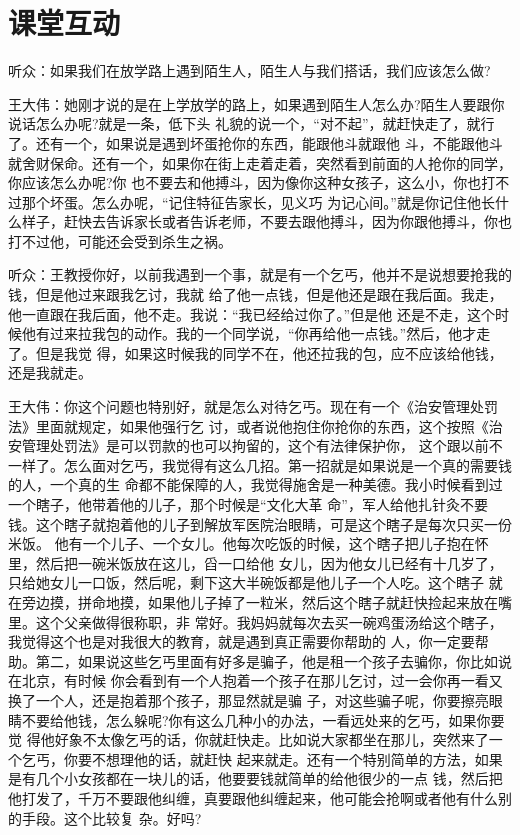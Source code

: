 \documentclass[11pt,a4paper,onecolumn]{article}
\begin{document}
\section{课堂互动}

听众：如果我们在放学路上遇到陌生人，陌生人与我们搭话，我们应该怎么做?

王大伟：她刚才说的是在上学放学的路上，如果遇到陌生人怎么办?陌生人要跟你说话怎么办呢?就是一条，低下头
礼貌的说一个，``对不起''，就赶快走了，就行了。还有一个，如果说是遇到坏蛋抢你的东西，能跟他斗就跟他
斗，不能跟他斗就舍财保命。还有一个，如果你在街上走着走着，突然看到前面的人抢你的同学，你应该怎么办呢?你
也不要去和他搏斗，因为像你这种女孩子，这么小，你也打不过那个坏蛋。怎么办呢，``记住特征告家长，见义巧
为记心间。''就是你记住他长什么样子，赶快去告诉家长或者告诉老师，不要去跟他搏斗，因为你跟他搏斗，你也
打不过他，可能还会受到杀生之祸。

听众：王教授你好，以前我遇到一个事，就是有一个乞丐，他并不是说想要抢我的钱，但是他过来跟我乞讨，我就
给了他一点钱，但是他还是跟在我后面。我走，他一直跟在我后面，他不走。我说：``我已经给过你了。''但是他
还是不走，这个时候他有过来拉我包的动作。我的一个同学说，``你再给他一点钱。''然后，他才走了。但是我觉
得，如果这时候我的同学不在，他还拉我的包，应不应该给他钱，还是我就走。

王大伟：你这个问题也特别好，就是怎么对待乞丐。现在有一个《治安管理处罚法》里面就规定，如果他强行乞
讨，或者说他抱住你抢你的东西，这个按照《治安管理处罚法》是可以罚款的也可以拘留的，这个有法律保护你，
这个跟以前不一样了。怎么面对乞丐，我觉得有这么几招。第一招就是如果说是一个真的需要钱的人，一个真的生
命都不能保障的人，我觉得施舍是一种美德。我小时候看到过一个瞎子，他带着他的儿子，那个时候是``文化大革
命''，军人给他扎针灸不要钱。这个瞎子就抱着他的儿子到解放军医院治眼睛，可是这个瞎子是每次只买一份米饭。
他有一个儿子、一个女儿。他每次吃饭的时候，这个瞎子把儿子抱在怀里，然后把一碗米饭放在这儿，舀一口给他
女儿，因为他女儿已经有十几岁了，只给她女儿一口饭，然后呢，剩下这大半碗饭都是他儿子一个人吃。这个瞎子
就在旁边摸，拼命地摸，如果他儿子掉了一粒米，然后这个瞎子就赶快捡起来放在嘴里。这个父亲做得很称职，非
常好。我妈妈就每次去买一碗鸡蛋汤给这个瞎子，我觉得这个也是对我很大的教育，就是遇到真正需要你帮助的
人，你一定要帮助。第二，如果说这些乞丐里面有好多是骗子，他是租一个孩子去骗你，你比如说在北京，有时候
你会看到有一个人抱着一个孩子在那儿乞讨，过一会你再一看又换了一个人，还是抱着那个孩子，那显然就是骗
子，对这些骗子呢，你要擦亮眼睛不要给他钱，怎么躲呢?你有这么几种小的办法，一看远处来的乞丐，如果你要觉
得他好象不太像乞丐的话，你就赶快走。比如说大家都坐在那儿，突然来了一个乞丐，你要不想理他的话，就赶快
起来就走。还有一个特别简单的方法，如果是有几个小女孩都在一块儿的话，他要要钱就简单的给他很少的一点
钱，然后把他打发了，千万不要跟他纠缠，真要跟他纠缠起来，他可能会抢啊或者他有什么别的手段。这个比较复
杂。好吗?
\end{document}
